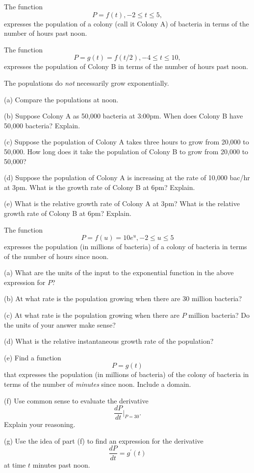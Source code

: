 \documentclass{ximera}
\begin{document}
\begin{question}  \label{Qdsfsadfghbhhhhyy}
The function
\[
        P = f(t) , -2 \leq t \leq 5,
\]
expresses the population of a colony (call it Colony A) of bacteria in terms of the number of hours past noon.

The function 
\[
          P =g(t) = f(t/2), -4 \leq t \leq 10,
\]
expresses the population of Colony B in terms of the number of hours past noon.

The populations do \emph{not} necessarily grow exponentially.


(a) Compare the populations at noon.


(b) Suppose Colony A as 50,000 bacteria at 3:00pm. When does Colony B have 50,000 bacteria? Explain.

(c) Suppose the population of Colony A takes three hours to grow from 20,000 to 50,000. How long does it take the population of Colony B to grow from 20,000 to 50,000?

(d) Suppose the population of Colony A is increasing at the rate of 10,000 bac/hr at 3pm. What is the growth rate of Colony B at 6pm? Explain. 

(e) What is the relative growth rate of Colony A at 3pm? What is the relative growth rate of Colony B at 6pm? Explain. 

\end{question}

\begin{question} \label{Q:432g4gh}
The function 
\[
       P = f(u) = 10e^u , -2\leq u \leq 5
\]
expresses the population (in millions of bacteria) of a colony of bacteria in terms of the number of hours since noon.

(a) What are the units of the input to the exponential function in the above expression for $P$?

(b) At what rate is the population growing when there are 30 million bacteria?

(c) At what rate is the population growing when there are $P$ million bacteria? Do the units of your answer make sense?

(d) What is the relative instantaneous growth rate of the population?

(e) Find a function
\[
         P = g(t) 
\]   
that expresses the population  (in millions of bacteria) of the colony of bacteria in terms of the number of \emph{minutes} since noon. Include a domain.

(f) Use common sense to evaluate the derivative
\[
      \frac{dP}{dt}\Big|_{P=30} .
\]
Explain your reasoning.

(g) Use the idea of part (f) to find an expression for the derivative
\[
    \frac{dP}{dt} = g^\prime(t)
\]
at time $t$ minutes past noon.

\end{question}
\end{document}
